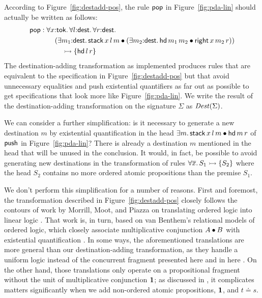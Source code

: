 According to Figure~\ref{fig:destadd-pos}, the rule 
${\sf pop}$ in Figure~\ref{fig:pda-lin} should actually be written as
follows:
\begin{align*} 
  {\sf pop} & : 
  \forall x{:}{\sf tok}.\,
  \forall l{:}{\sf dest}.\,
  \forall r{:}{\sf dest}.\,
  \\
  & \qquad (\exists m_1{:}{\sf dest}.\, {\sf stack}\,x\,l\,m \mathbin{\bullet}
   (\exists m_2{:}{\sf dest}.\, {\sf hd}\,m_1\,m_2 \mathbin{\bullet}
     {\sf right}\,x\,m_2\,r))
  \\ 
  & \qquad\quad \rightarrowtail
  \{ 
    {\sf hd}\,l\,r
  \}
\end{align*}
The destination-adding transformation as
implemented produces rules that are
equivalent to the specification in Figure~\ref{fig:destadd-pos}
but that avoid unnecessary equalities and push existential quantifiers
as far out as possible to get specifications that look more like
Figure~\ref{fig:pda-lin}. We write the result of the destination-adding
transformation on the signature $\Sigma$ as ${\it Dest}(\Sigma)$. 

We can consider a further simplification: is it necessary to generate
a new destination $m$ by existential quantification in the head
$\exists m.\,{\sf stack}\,x\,l\,m \mathbin{\bullet} {\sf hd}\,m\,r$ of ${\sf
  push}$ in Figure~\ref{fig:pda-lin}? There is already a destination
$m$ mentioned in the head that will be unused in the conclusion.  It
would, in fact, be possible to avoid generating new destinations in
the transformation of rules $\forall \overline{x}.\,S_1 \rightarrowtail \{ S_2
\}$ where the head $S_2$ contains no more ordered atomic propositions
than the premise $S_1$. 

We don't perform this simplification for a
number of reasons.  First and foremost, the transformation described
in Figure~\ref{fig:destadd-pos} closely follows the contours of work
by Morrill, Moot, and Piazza on translating ordered logic into linear
logic \cite{morrill95higher,moot01linguistic}. That work is, in turn,
based on van Benthem's relational models of ordered logic, which
closely associate multiplicative conjunction $A \mathbin{\bullet} B$ with
existential quantification \cite{vanbenthem91relational}. In some
ways, the aforementioned translations are more general than our
destination-adding transformation, as they handle a uniform logic
instead of the concurrent fragment presented here and in here
\cite{simmons11logical}. On the other hand, those translations only
operate on a propositional fragment without the unit of multiplicative
conjunction $\mathbf{1}$; as discussed in \cite[p.~57]{simmons11logical},
it complicates matters significantly when we add
non-ordered atomic propositions, $\mathbf{1}$, and $t \doteq s$.


